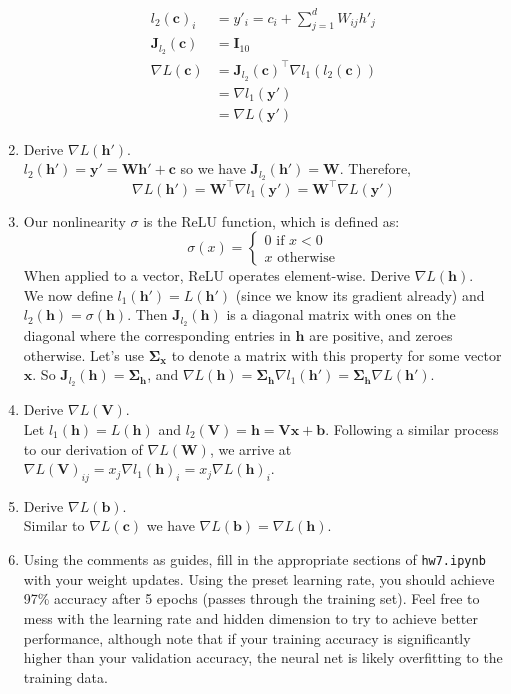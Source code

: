 \documentclass{article}
\begin{document}
\begin{enumerate}[label=\arabic*.]
{\begin{align*}
		l_2(\mathbf{c})_i  &= y'_i = c_i + \sum_{j=1}^d W_{ij}h'_j\\
		\mathbf{J}_{l_2}(\mathbf{c}) &= \mathbf{I}_{10}\\
		\nabla L(\mathbf{c}) &= \mathbf{J}_{l_2}(\mathbf{c})^\top\nabla l_1(l_2(\mathbf{c}))\\
		&= \nabla l_1(\mathbf{y'})\\
		&= \nabla L(\mathbf{y'})
		\end{align*}
	}
\item Derive $\nabla L(\mathbf{h'})$.\\
	{\color{blue} $l_2(\mathbf{h'}) = \mathbf{y'} = \mathbf{Wh' + c}$ so we have $\mathbf{J}_{l_2}(\mathbf{h'}) = \mathbf{W}$. Therefore,
		$$\nabla L(\mathbf{h'}) = \mathbf{W}^\top \nabla l_1(\mathbf{y'}) = \mathbf{W}^\top\nabla L(\mathbf{y'})$$
	}
\item Our nonlinearity $\sigma$ is the ReLU function, which is defined as: $$ \sigma(x) = \begin{cases} 0 \text{ if } x < 0 \\ x \text{ otherwise} \end{cases}$$ When applied to a vector, ReLU operates element-wise. Derive $\nabla L(\mathbf{h})$.\\
	{\color{blue} We now define $l_1(\mathbf{h'}) = L(\mathbf{h'})$ (since we know its gradient already) and $l_2(\mathbf{h}) = \sigma(\mathbf{h})$. Then $\mathbf{J}_{l_2}(\mathbf{h})$ is a diagonal matrix with ones on the diagonal where the corresponding entries in $\mathbf{h}$ are positive, and zeroes otherwise. Let's use $\mathbf{\Sigma_x}$ to denote a matrix with this property for some vector $\mathbf{x}$. So $\mathbf{J}_{l_2}(\mathbf{h}) = \mathbf{\Sigma_h}$, and $\nabla L(\mathbf{h}) = \mathbf{\Sigma_h}\nabla l_1(\mathbf{h'}) = \mathbf{\Sigma_h}\nabla L(\mathbf{h'})$.}
\item Derive $\nabla L(\mathbf{V})$.\\
	{\color{blue} Let $l_1(\mathbf{h}) = L(\mathbf{h})$ and $l_2(\mathbf{V}) = \mathbf{h} = \mathbf{Vx + b}$. Following a similar process to our derivation of $\nabla L(\mathbf{W})$, we arrive at $\nabla L(\mathbf{V})_{ij} = x_j\nabla l_1(\mathbf{h})_i = x_j\nabla L(\mathbf{h})_i$.}
\item Derive $\nabla L(\mathbf{b})$.\\
	{\color{blue} Similar to $\nabla L(\mathbf{c})$ we have $\nabla L(\mathbf{b}) = \nabla L(\mathbf{h})$.}
\item Using the comments as guides, fill in the appropriate sections of \verb|hw7.ipynb| with your weight updates. Using the preset learning rate, you should achieve 97\% accuracy after 5 epochs (passes through the training set). Feel free to mess with the learning rate and hidden dimension to try to achieve better performance, although note that if your training accuracy is significantly higher than your validation accuracy, the neural net is likely overfitting to the training data.
\end{enumerate}
\end{document}
